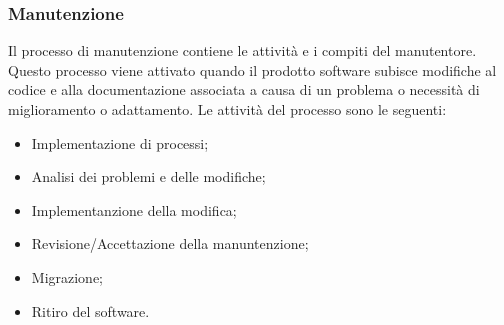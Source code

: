 \subsubsection{Manutenzione}
Il processo di manutenzione contiene le attività e i compiti del manutentore. Questo processo viene attivato quando il prodotto software subisce modifiche al codice e alla documentazione associata a causa di un problema o necessità di miglioramento o adattamento.
Le attività del processo sono le seguenti:
\begin{itemize}
\item Implementazione di processi;
\item Analisi dei problemi e delle modifiche;
\item Implementanzione della modifica;
\item Revisione/Accettazione della manuntenzione;
\item Migrazione;
\item Ritiro del software.
\end{itemize}


